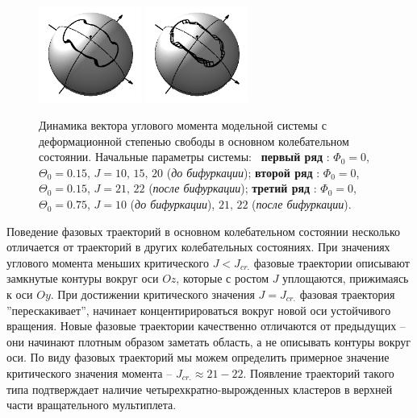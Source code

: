 \begin{figure}[H]
	\includegraphics[width=0.3\textwidth]{../pictures/rigid_base/plot_J=21n=0theta=75.png}
	\includegraphics[width=0.3\textwidth]{../pictures/rigid_base/plot_J=22n=0theta=75.png}
	\caption{Динамика вектора углового момента модельной системы с деформационной степенью свободы в основном колебательном состоянии. Начальные параметры системы: \
	\textbf{первый ряд} : $\Phi_0 = 0$, $\Theta_0 = 0.15$, $J = 10, \, 15, \, 20$ (\textit{до бифуркации});
	\textbf{второй ряд} : $\Phi_0 = 0$, $\Theta_0 = 0.15$, $J = 21, \, 22$ (\textit{после бифуркации});
	\textbf{третий ряд} : $\Phi_0 = 0$, $\Theta_0 = 0.75$, $J = 10$ (\textit{до бифуркации}), $21, \, 22$ (\textit{после бифуркации}).}
	\label{fig:rigid_base1}
\end{figure}

Поведение фазовых траекторий в основном колебательном состоянии несколько отличается от траекторий в других колебательных состояниях. При значениях углового момента меньших критического $J < J_{cr.}$ фазовые траектории описывают замкнутые контуры вокруг оси $Oz$, которые с ростом $J$ уплощаются, прижимаясь к оси $Oy$. При достижении критического значения $J = J_{cr.}$ фазовая траектория ''перескакивает'', начинает концентирироваться вокруг новой оси устойчивого вращения. Новые фазовые траектории качественно отличаются от предыдущих -- они начинают плотным образом заметать область, а не описывать контуры вокруг оси. По виду фазовых траекторий мы можем определить примерное значение критического значения момента -- $J_{cr.} \approx 21-22$. Появление траекторий такого типа подтверждает наличие четырехкратно-вырожденных кластеров в верхней части вращательного мультиплета.

